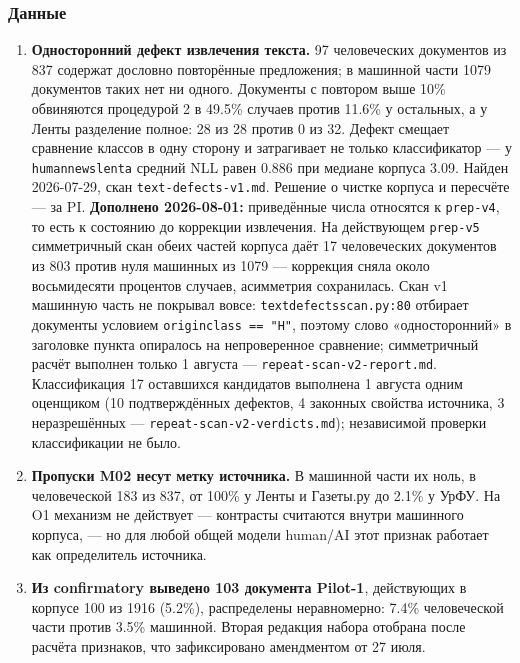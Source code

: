 \documentclass[11pt,a4paper]{article}
\renewcommand{\_}{\textunderscore\allowbreak}
\begin{document}
\subsubsection{Данные}

\begin{enumerate}
\item[14.] \textbf{Односторонний дефект извлечения текста.} 97 человеческих документов из 837 содержат дословно повторённые предложения; в машинной части 1079 документов таких нет ни одного. Документы с повтором выше 10\% обвиняются процедурой 2 в 49.5\% случаев против 11.6\% у остальных, а у Ленты разделение полное: 28 из 28 против 0 из 32. Дефект смещает сравнение классов в одну сторону и затрагивает не только классификатор — у \texttt{human\_news\_lenta\_0019} средний NLL равен 0.886 при медиане корпуса 3.09. Найден 2026-07-29, скан \texttt{text-\allowbreak{}defects-\allowbreak{}v1.md}. Решение о чистке корпуса и пересчёте — за PI. \textbf{Дополнено 2026-08-01:} приведённые числа относятся к \texttt{prep-\allowbreak{}v4}, то есть к состоянию до коррекции извлечения. На действующем \texttt{prep-\allowbreak{}v5} симметричный скан обеих частей корпуса даёт 17 человеческих документов из 803 против нуля машинных из 1079 — коррекция сняла около восьмидесяти процентов случаев, асимметрия сохранилась. Скан v1 машинную часть не покрывал вовсе: \texttt{text\_defects\_scan.py:80} отбирает документы условием \texttt{origin\_class == "H"}, поэтому слово «односторонний» в заголовке пункта опиралось на непроверенное сравнение; симметричный расчёт выполнен только 1 августа — \texttt{repeat-\allowbreak{}scan-\allowbreak{}v2-\allowbreak{}report.md}. Классификация 17 оставшихся кандидатов выполнена 1 августа одним оценщиком (10 подтверждённых дефектов, 4 законных свойства источника, 3 неразрешённых — \texttt{repeat-\allowbreak{}scan-\allowbreak{}v2-\allowbreak{}verdicts.md}); независимой проверки классификации не было.
\item[15.] \textbf{Пропуски M02 несут метку источника.} В машинной части их ноль, в человеческой 183 из 837, от 100\% у Ленты и Газеты.ру до 2.1\% у УрФУ. На O1 механизм не действует — контрасты считаются внутри машинного корпуса, — но для любой общей модели human/AI этот признак работает как определитель источника.
\item[16.] \textbf{Из confirmatory выведено 103 документа Pilot-1}, действующих в корпусе 100 из 1916 (5.2\%), распределены неравномерно: 7.4\% человеческой части против 3.5\% машинной. Вторая редакция набора отобрана после расчёта признаков, что зафиксировано амендментом от 27 июля.

\end{enumerate}
\end{document}
